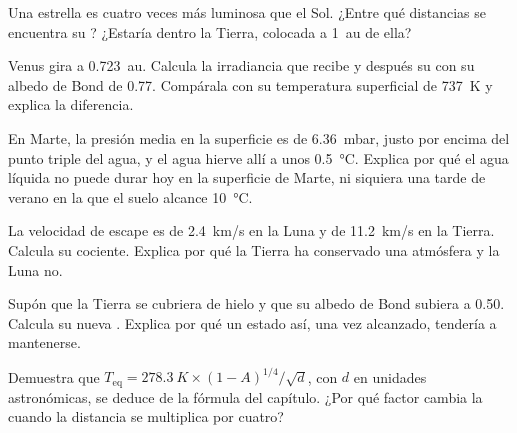 \begin{exercise}[$\star\star$]\label{exo:g10:habitable-planet:7}
Una estrella es cuatro veces más luminosa que el Sol. ¿Entre qué distancias
se encuentra su ? ¿Estaría dentro la Tierra, colocada a
\qty{1}{au} de ella?
\end{exercise}

\begin{exercise}[$\star\star$]\label{exo:g10:habitable-planet:8}
Venus gira a \qty{0.723}{au}. Calcula la irradiancia que recibe y después su
 con su albedo de Bond de 0.77. Compárala con su
temperatura superficial de \qty{737}{K} y explica la diferencia.
\end{exercise}

\begin{exercise}[$\star\star$]\label{exo:g10:habitable-planet:9}
En Marte, la presión media en la superficie es de \qty{6.36}{mbar}, justo
por encima del punto triple del agua, y el agua hierve allí a unos
\qty{0.5}{\degreeCelsius}. Explica por qué el agua líquida no puede durar
hoy en la superficie de Marte, ni siquiera una tarde de verano en la que el
suelo alcance \qty{10}{\degreeCelsius}.
\end{exercise}

\begin{exercise}[$\star\star$]\label{exo:g10:habitable-planet:10}
La velocidad de escape es de \qty{2.4}{km/s} en la Luna y de
\qty{11.2}{km/s} en la Tierra. Calcula su cociente. Explica por qué la
Tierra ha conservado una atmósfera y la Luna no.
\end{exercise}

\begin{exercise}[$\star\star$]\label{exo:g10:habitable-planet:11}
Supón que la Tierra se cubriera de hielo y que su albedo de Bond subiera a
0.50. Calcula su nueva . Explica por qué un estado
así, una vez alcanzado, tendería a mantenerse.
\end{exercise}

\begin{exercise}[$\star\star\star$]\label{exo:g10:habitable-planet:12}
Demuestra que $T_{\mathrm{eq}} = \qty{278.3}{K} \times (1-A)^{1/4}/\sqrt{d}$,
con $d$ en unidades astronómicas, se deduce de la fórmula del capítulo. ¿Por
qué factor cambia la  cuando la distancia se
multiplica por cuatro?
\end{exercise}

